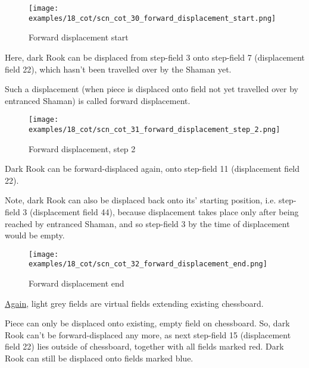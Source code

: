 \noindent
\begin{figure}[!h]
\texttt{[image: examples/18\_cot/scn\_cot\_30\_forward\_displacement\_start.png]}
\caption{Forward displacement start}
\label{fig:scn_cot_30_forward_displacement_start}
\end{figure}

Here, dark Rook can be displaced from step-field 3 onto step-field 7 (displacement field 22),
which hasn't been travelled over by the Shaman yet.

Such a displacement (when piece is displaced onto field not yet travelled over by entranced Shaman)
is called forward displacement.

\clearpage %

\noindent
\begin{figure}[!h]
\texttt{[image: examples/18\_cot/scn\_cot\_31\_forward\_displacement\_step\_2.png]}
\caption{Forward displacement, step 2}
\label{fig:scn_cot_31_forward_displacement_step_2}
\end{figure}

Dark Rook can be forward-displaced again, onto step-field 11 (displacement field 22).

Note, dark Rook can also be displaced back onto its' starting position, i.e. step-field 3
(displacement field 44), because displacement takes place only after being reached by
entranced Shaman, and so step-field 3 by the time of displacement would be empty.

\clearpage %

\noindent
\begin{figure}[!h]
\texttt{[image: examples/18\_cot/scn\_cot\_32\_forward\_displacement\_end.png]}
\caption{Forward displacement end}
\label{fig:scn_cot_32_forward_displacement_end}
\end{figure}

\hyperref[fig:scn_hd_04_centaur_off_board]{Again},
light grey fields are virtual fields extending existing chessboard.

Piece can only be displaced onto existing, empty field on chessboard. So, dark Rook can't be
forward-displaced any more, as next step-field 15 (displacement field 22) lies outside of
chessboard, together with all fields marked red. Dark Rook can still be displaced onto fields
marked blue.

